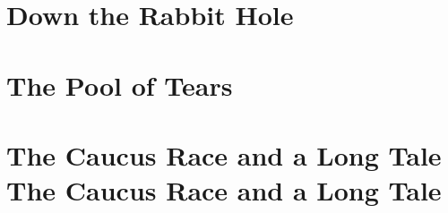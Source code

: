 \documentclass{memoir}
\begin{document}
\tableofcontents*

\chapter{Down the Rabbit Hole}
\chapter{The Pool of Tears}
\chapter{The Caucus Race and a Long Tale The Caucus Race and a Long Tale }
\setcounter{page}{14}%
\end{document}
